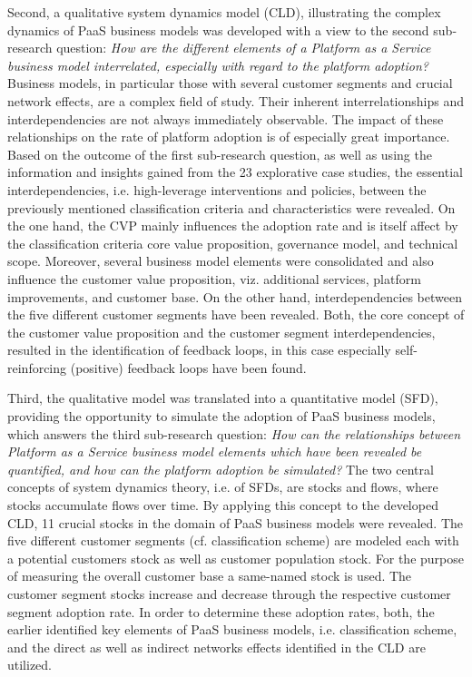 	Second, a qualitative system dynamics model (\acf{CLD}), illustrating the complex dynamics of \ac{PaaS} business models was developed with a view to the second sub-research question: \textit{How are the different elements of a Platform as a Service business model interrelated, especially with regard to the platform adoption?} Business models, in particular those with several customer segments and crucial network effects, are a complex field of study. Their inherent interrelationships and interdependencies are not always immediately observable. The impact of these relationships on the rate of platform adoption is of especially great importance. Based on the outcome of the first sub-research question, as well as using the information and insights gained from the 23 explorative case studies, the essential interdependencies, i.e. high-leverage interventions and policies, between the previously mentioned classification criteria and characteristics were revealed. On the one hand, the \acf{CVP} mainly influences the adoption rate and is itself affect by the classification criteria core value proposition, governance model, and technical scope. Moreover, several business model elements were consolidated and also influence the customer value proposition, viz. additional services, platform improvements, and customer base. On the other hand, interdependencies between the five different customer segments have been revealed. Both, the core concept of the customer value proposition and the customer segment interdependencies, resulted in the identification of feedback loops, in this case especially self-reinforcing (positive) feedback loops have been found.
	
	Third, the qualitative model was translated into a quantitative model (\acf{SFD}), providing the opportunity to simulate the adoption of \ac{PaaS} business models, which answers the third sub-research question: \textit{How can the relationships between Platform as a Service business model elements which have been revealed be quantified, and how can the platform adoption be simulated?} The two central concepts of system dynamics theory, i.e. of \acp{SFD}, are stocks and flows, where stocks accumulate flows over time. By applying this concept to the developed \ac{CLD}, 11 crucial stocks in the domain of \ac{PaaS} business models were revealed. The five different customer segments (cf. classification scheme) are modeled each with a potential customers stock as well as customer population stock. For the purpose of measuring the overall customer base a same-named stock is used. The customer segment stocks increase and decrease through the respective customer segment adoption rate. In order to determine these adoption rates, both, the earlier identified key elements of \ac{PaaS} business models, i.e. classification scheme, and the direct as well as indirect networks effects identified in the \ac{CLD} are utilized.
	
